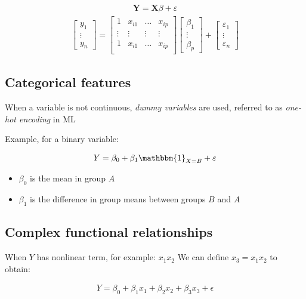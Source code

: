 \documentclass{article}
\begin{document}
\begin{align*}
    \mathbf{Y}=\mathbf{X}\beta+\varepsilon
\end{align*}
\begin{align*}
    \begin{bmatrix}
    y_1 \\
    \vdots \\
    y_n
    \end{bmatrix}
    =
    \begin{bmatrix}
    1 & x_{i1} & \hdots & x_{ip} \\
    \vdots & \vdots & \vdots & \vdots \\
    1 & x_{i1} & \hdots & x_{ip} \\
    \end{bmatrix}
    \begin{bmatrix}
    \beta_1 \\
    \vdots \\
    \beta_p
    \end{bmatrix}
    +
    \begin{bmatrix}
    \varepsilon_1 \\
    \vdots \\
    \varepsilon_n
    \end{bmatrix}
\end{align*}

\subsection{Categorical features}

When a variable is not continuous, \textit{dummy variables} are used, referred to as \textit{one-hot encoding} in ML

Example, for a binary variable:

\begin{align*}
    Y=\beta_0+\beta_1\mathbbm{1}_{X=B}+\varepsilon
\end{align*}

\begin{itemize}
    \item $\beta_0$ is the mean in group $A$
    \item $\beta_1$ is the difference in group means between groups $B$ and $A$
\end{itemize}

\pagebreak

\subsection{Complex functional relationships}

When $Y$ has nonlinear term, for example: $x_1x_2$
We can define $x_3=x_1x_2$ to obtain:

\begin{align*}
    Y=\beta_0+\beta_1x_1+\beta_2x_2+\beta_3x_3+\epsilon
\end{align*}
\end{document}
